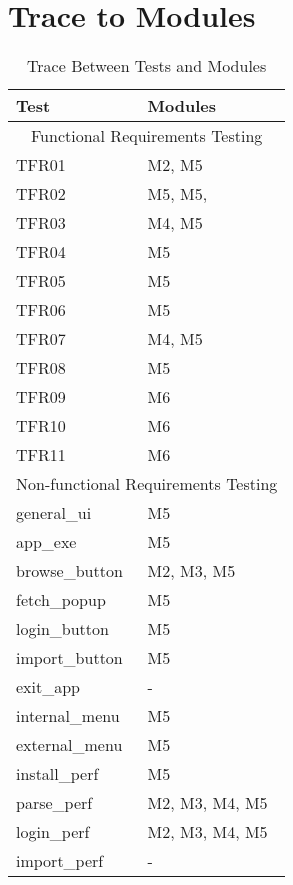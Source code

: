 \documentclass[12pt, titlepage]{article}
\begin{document}
		\FloatBarrier
	


	
\section{Trace to Modules}		
\begin{table}[!htbp]
	\begin{tabular}{ll}
		\toprule
		Test & Modules \\
		\midrule
		\multicolumn{2}{c}{Functional Requirements Testing} \\
		\midrule
        TFR01 & M2, M5 \\
        TFR02 & M5, M5,  \\
        TFR03 & M4, M5 \\
        TFR04 & M5 \\
        TFR05 & M5 \\
        TFR06 & M5 \\
        TFR07 & M4, M5 \\
        TFR08 & M5 \\
        TFR09 & M6 \\
        TFR10 & M6 \\
        TFR11 & M6 \\
		\midrule
		\multicolumn{2}{c}{Non-functional Requirements Testing} \\
		\midrule
        general\_ui & M5 \\
        app\_exe & M5 \\
        browse\_button & M2, M3, M5 \\
        fetch\_popup & M5 \\
        login\_button & M5 \\
        import\_button & M5 \\
        exit\_app & - \\
        internal\_menu & M5 \\
        external\_menu & M5 \\
        install\_perf & M5 \\
        parse\_perf & M2, M3, M4, M5 \\
        login\_perf & M2, M3, M4, M5 \\
        import\_perf & - \\
 		\bottomrule
	\end{tabular}
	\caption{Trace Between Tests and Modules}
	\makeatletter
	\def\rulecolor#1#{\CT@arc{#1}}
	\def\CT@arc#1#2{%
		\ifdim\baselineskip=\z@\noalign\fi
		{\gdef\CT@arc@{\color#1{#2}}}}
	\let\CT@arc@\relax
	\makeatother
	\label{Table}
\end{table}       
        
\end{document}
